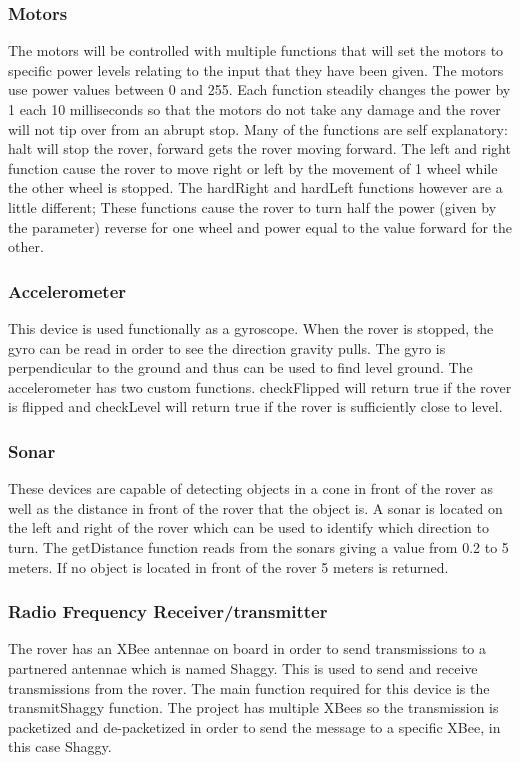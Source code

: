 \documentclass[journal,10pt,draftclsnofoot,onecolumn,compsoc]{IEEEtran} \usepackage[margin=0.75in]{geometry}
\begin{document}
\subsubsection{Motors}
The motors will be controlled with multiple functions that will set the motors to specific power levels relating to the input that they have been given. The motors use power values between 0 and 255. Each function steadily changes the power by 1 each 10 milliseconds so that the motors do not take any damage and the rover will not tip over from an abrupt stop. Many of the functions are self explanatory: halt will stop the rover, forward gets the rover moving forward. The left and right function cause the rover to move right or left by the movement of 1 wheel while the other wheel is stopped. The hardRight and hardLeft functions however are a little different; These functions cause the rover to turn half the power (given by the parameter) reverse for one wheel and power equal to the value forward for the other. 

\subsubsection{Accelerometer}
This device is used functionally as a gyroscope. When the rover is stopped, the gyro can be read in order to see the direction gravity pulls. The gyro is perpendicular to the ground and thus can be used to find level ground. The accelerometer has two custom functions. checkFlipped will return true if the rover is flipped and checkLevel will return true if the rover is sufficiently close to level.

\subsubsection{Sonar}
These devices are capable of detecting objects in a cone in front of the rover as well as the distance in front of the rover that the object is. A sonar is located on the left and right of the rover which can be used to identify which direction to turn. The getDistance function reads from the sonars giving a value from 0.2 to 5 meters. If no object is located in front of the rover 5 meters is returned. 

\subsubsection{Radio Frequency Receiver/transmitter}
The rover has an XBee antennae on board in order to send transmissions to a partnered antennae which is named Shaggy. This is used to send and receive transmissions from the rover. The main function required for this device is the transmitShaggy function. The project has multiple XBees so the transmission is packetized and de-packetized in order to send the message to a specific XBee, in this case Shaggy.
\end{document}

